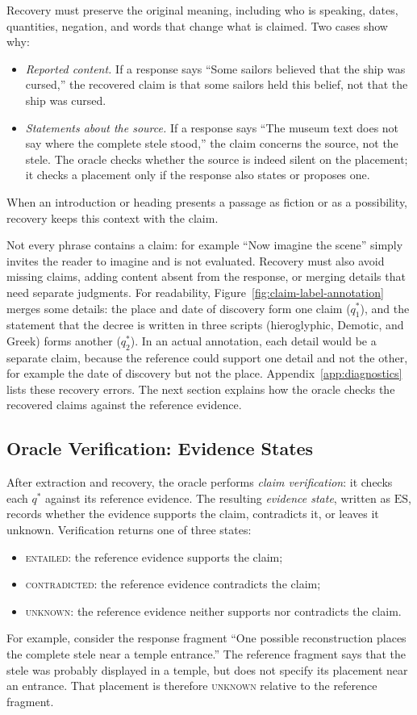 \documentclass{clv2025}
\begin{document}
Recovery must preserve the original meaning, including who is speaking,
dates, quantities, negation, and words that change what is claimed. Two
cases show why:
\begin{itemize}
\item \emph{Reported content.} If a response says ``Some sailors believed
that the ship was cursed,'' the recovered claim is that some sailors held
this belief, not that the ship was cursed.
\item \emph{Statements about the source.} If a response says ``The museum
text does not say where the complete stele stood,'' the claim concerns the
source, not the stele. The oracle checks whether the source is indeed
silent on the placement; it checks a placement only if the response also
states or proposes one.
\end{itemize}
When an introduction or heading presents a passage as fiction or as a
possibility, recovery keeps this context with the claim.

Not every phrase contains a claim: for example ``Now imagine the scene'' simply invites
the reader to imagine and is not evaluated. Recovery must also avoid
missing claims, adding content absent from the response, or merging
details that need separate judgments. For readability,
Figure~\ref{fig:claim-label-annotation} merges some details: the place and
date of discovery form one claim ($q^*_1$), and the statement that the decree is written in three scripts (hieroglyphic, Demotic, and Greek)
forms another ($q^*_2$). In an actual annotation, each detail would
be a separate claim, because the reference could support one detail and
not the other, for example the date of discovery but not the place.
Appendix~\ref{app:diagnostics} lists these recovery errors. The next
section explains how the oracle checks the recovered claims against the
reference evidence.

\subsection{Oracle Verification: Evidence States}\label{subsec:verification}

After extraction and recovery, the oracle performs \emph{claim verification}:
it checks each $q^*$ against its reference evidence. The resulting
\emph{evidence state}, written as $\mathrm{ES}$, records whether the evidence
supports the claim, contradicts it, or leaves it unknown. Verification
returns one of three states:
\begin{itemize}
\item \textsc{entailed}: the reference evidence supports the claim;
\item \textsc{contradicted}: the reference evidence contradicts the claim;
\item \textsc{unknown}: the reference evidence neither supports nor
contradicts the claim.
\end{itemize}
For example, consider the response fragment ``One possible reconstruction places the complete
stele near a temple entrance.'' The reference fragment says that the
stele was probably displayed in a temple, but does not specify its
placement near an entrance. That placement is therefore \textsc{unknown}
relative to the reference fragment.
\end{document}
